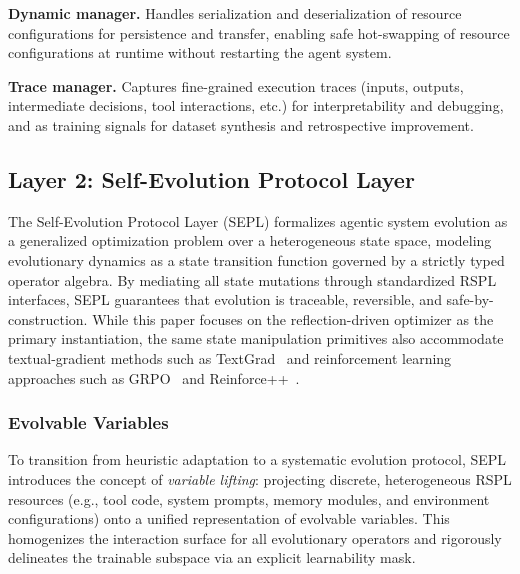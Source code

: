 \textbf{Dynamic manager.} Handles serialization and deserialization of resource configurations for persistence and transfer, enabling safe hot-swapping of resource configurations at runtime without restarting the agent system.

\textbf{Trace manager.} Captures fine-grained execution traces (inputs, outputs, intermediate decisions, tool interactions, etc.) for interpretability and debugging, and as training signals for dataset synthesis and retrospective improvement.


\subsection{Layer 2: Self-Evolution Protocol Layer}
\label{sec:appendix-self-evolution-protocol-layer}

The Self-Evolution Protocol Layer (SEPL) formalizes agentic system evolution as a generalized optimization problem over a heterogeneous state space, modeling evolutionary dynamics as a state transition function governed by a strictly typed operator algebra. By mediating all state mutations through standardized RSPL interfaces, SEPL guarantees that evolution is traceable, reversible, and safe-by-construction. While this paper focuses on the reflection-driven optimizer as the primary instantiation, the same state manipulation primitives also accommodate textual-gradient methods such as TextGrad~\citep{yuksekgonul2025optimizing} and reinforcement learning approaches such as GRPO~\citep{shao2024deepseekmath} and Reinforce++~\citep{hu2025reinforce++}.

\subsubsection{Evolvable Variables}

To transition from heuristic adaptation to a systematic evolution protocol, SEPL introduces the concept of \emph{variable lifting}: projecting discrete, heterogeneous RSPL resources (e.g., tool code, system prompts, memory modules, and environment configurations) onto a unified representation of evolvable variables. This homogenizes the interaction surface for all evolutionary operators and rigorously delineates the trainable subspace via an explicit learnability mask.


